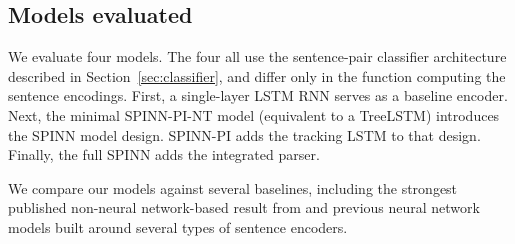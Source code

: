 \documentclass[11pt]{article}
\begin{document}
\subsection{Models evaluated}

We evaluate four models. The four all use the sentence-pair classifier architecture described in Section~\ref{sec:classifier}, and differ only in the function computing the sentence encodings. First, a single-layer LSTM RNN \citep[similar to that of][]{snli:emnlp2015} serves as a baseline encoder. Next, the minimal SPINN-PI-NT model (equivalent to a TreeLSTM) introduces the SPINN model design. SPINN-PI adds the tracking LSTM to that design. Finally, the full SPINN adds the integrated parser.

We compare our models against several baselines, including the strongest published non-neural network-based result from \citet{snli:emnlp2015} and previous neural network models built around several types of sentence encoders.
\end{document}
